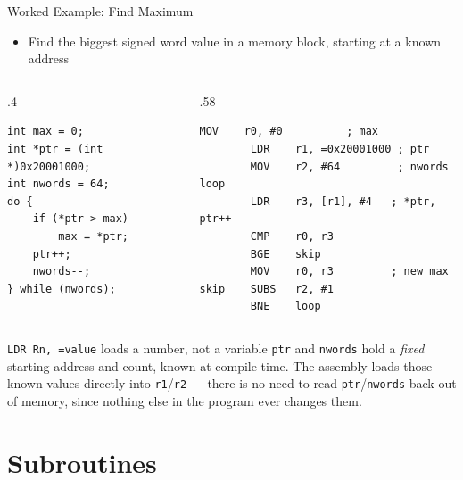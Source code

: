 \documentclass[9pt,aspectratio=169,xcolor=table]{beamer}
\begin{document}
\begin{frame}[fragile]{Worked Example: Find Maximum}
    \begin{itemize}
        \item Find the biggest signed word value in a memory block, starting at a known address
    \end{itemize}

    \vspace{1mm}
    \begin{columns}[T]
    \begin{column}{.4\textwidth}
        \begin{lstlisting}[style=myc]
int max = 0;
int *ptr = (int *)0x20001000;
int nwords = 64;
do {
    if (*ptr > max)
        max = *ptr;
    ptr++;
    nwords--;
} while (nwords);
        \end{lstlisting}
    \end{column}
    \begin{column}{.58\textwidth}
        \begin{lstlisting}[style=armasm, language=ARM]
		MOV    r0, #0          ; max
		LDR    r1, =0x20001000 ; ptr
		MOV    r2, #64         ; nwords
loop
    	LDR    r3, [r1], #4   ; *ptr, ptr++
    	CMP    r0, r3
    	BGE    skip
    	MOV    r0, r3         ; new max
skip	SUBS   r2, #1
    	BNE    loop
        \end{lstlisting}
    \end{column}
    \end{columns}

    \vspace{2mm}
    \begin{block}{\texttt{LDR Rn, =value} loads a number, not a variable}
        \texttt{ptr} and \texttt{nwords} hold a \emph{fixed} starting
        address and count, known at compile time. The assembly loads
        those known values directly into \texttt{r1}/\texttt{r2} ---
        there is no need to read \texttt{ptr}/\texttt{nwords} back out
        of memory, since nothing else in the program ever changes them.
    \end{block}
\end{frame}

\section{Subroutines}
\end{document}
